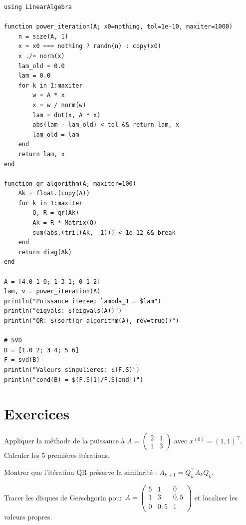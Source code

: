 \begin{codeblock}[title=\textbf{Julia}]
\begin{verbatim}
using LinearAlgebra

function power_iteration(A; x0=nothing, tol=1e-10, maxiter=1000)
    n = size(A, 1)
    x = x0 === nothing ? randn(n) : copy(x0)
    x ./= norm(x)
    lam_old = 0.0
    lam = 0.0
    for k in 1:maxiter
        w = A * x
        x = w / norm(w)
        lam = dot(x, A * x)
        abs(lam - lam_old) < tol && return lam, x
        lam_old = lam
    end
    return lam, x
end

function qr_algorithm(A; maxiter=100)
    Ak = float.(copy(A))
    for k in 1:maxiter
        Q, R = qr(Ak)
        Ak = R * Matrix(Q)
        sum(abs.(tril(Ak, -1))) < 1e-12 && break
    end
    return diag(Ak)
end

A = [4.0 1 0; 1 3 1; 0 1 2]
lam, v = power_iteration(A)
println("Puissance iteree: lambda_1 = $lam")
println("eigvals: $(eigvals(A))")
println("QR: $(sort(qr_algorithm(A), rev=true))")

# SVD
B = [1.0 2; 3 4; 5 6]
F = svd(B)
println("Valeurs singulieres: $(F.S)")
println("cond(B) = $(F.S[1]/F.S[end])")
\end{verbatim}
\end{codeblock}

\section{Exercices}

\begin{exercice}[$\star$]
Appliquer la m\'ethode de la puissance \`a $A=\begin{pmatrix}2&1\\1&3\end{pmatrix}$ avec $x^{(0)}=(1,1)^\top$. Calculer les 5 premi\`eres it\'erations.
\end{exercice}

\begin{exercice}[$\star\star$]
Montrer que l'it\'eration QR pr\'eserve la similarit\'e : $A_{k+1}=Q_k^\top A_k Q_k$.
\end{exercice}

\begin{exercice}[$\star\star$]
Tracer les disques de Gerschgorin pour $A=\begin{pmatrix}5&1&0\\1&3&0{,}5\\0&0{,}5&1\end{pmatrix}$ et localiser les valeurs propres.
\end{exercice}

